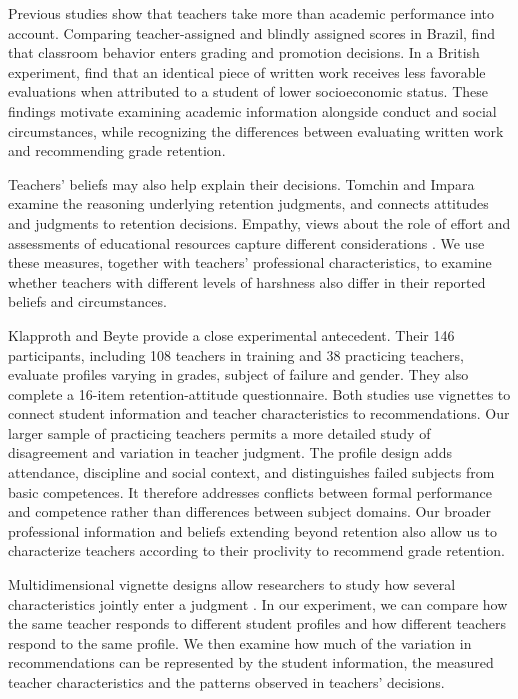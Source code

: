 Previous studies show that teachers take more than academic performance into account. Comparing teacher-assigned and blindly assigned scores in Brazil, \citet{ferman} find that classroom behavior enters grading and promotion decisions. In a British experiment, \citet{doyle} find that an identical piece of written work receives less favorable evaluations when attributed to a student of lower socioeconomic status. These findings motivate examining academic information alongside conduct and social circumstances, while recognizing the differences between evaluating written work and recommending grade retention.

Teachers' beliefs may also help explain their decisions. Tomchin and Impara \citeyearpar{tomchin} examine the reasoning underlying retention judgments, and \citet{bonvin} connects attitudes and judgments to retention decisions. Empathy, views about the role of effort and assessments of educational resources capture different considerations \citep{pajares}. We use these measures, together with teachers' professional characteristics, to examine whether teachers with different levels of harshness also differ in their reported beliefs and circumstances.

Klapproth and Beyte \citeyearpar{klapproth} provide a close experimental antecedent. Their 146 participants, including 108 teachers in training and 38 practicing teachers, evaluate profiles varying in grades, subject of failure and gender. They also complete a 16-item retention-attitude questionnaire. Both studies use vignettes to connect student information and teacher characteristics to recommendations. Our larger sample of practicing teachers permits a more detailed study of disagreement and variation in teacher judgment. The profile design adds attendance, discipline and social context, and distinguishes failed subjects from basic competences. It therefore addresses conflicts between formal performance and competence rather than differences between subject domains. Our broader professional information and beliefs extending beyond retention also allow us to characterize teachers according to their proclivity to recommend grade retention.

Multidimensional vignette designs allow researchers to study how several characteristics jointly enter a judgment \citep{conjoint,hainmueller2015}. In our experiment, we can compare how the same teacher responds to different student profiles and how different teachers respond to the same profile. We then examine how much of the variation in recommendations can be represented by the student information, the measured teacher characteristics and the patterns observed in teachers' decisions.

